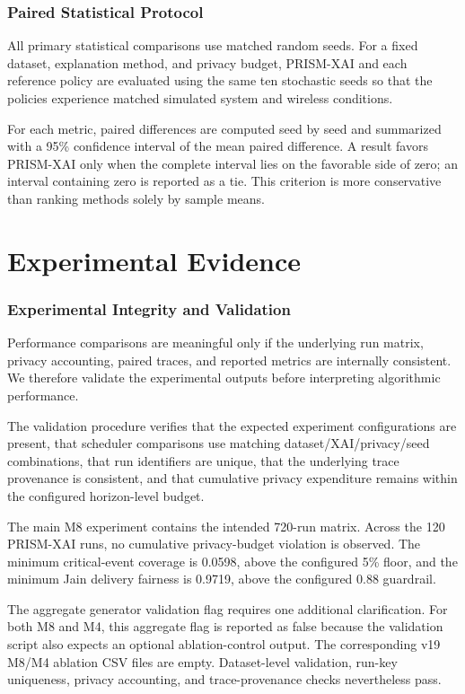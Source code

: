 \documentclass[11pt]{article}
\begin{document}
\section{Paired Statistical Protocol}

All primary statistical comparisons use matched random seeds. For a fixed dataset, explanation method, and privacy budget, PRISM-XAI and each reference policy are evaluated using the same ten stochastic seeds so that the policies experience matched simulated system and wireless conditions.

For each metric, paired differences are computed seed by seed and summarized with a 95\% confidence interval of the mean paired difference. A result favors PRISM-XAI only when the complete interval lies on the favorable side of zero; an interval containing zero is reported as a tie. This criterion is more conservative than ranking methods solely by sample means.

\part{ Experimental Evidence}

\section{Experimental Integrity and Validation}

Performance comparisons are meaningful only if the underlying run matrix, privacy accounting, paired traces, and reported metrics are internally consistent. We therefore validate the experimental outputs before interpreting algorithmic performance.

The validation procedure verifies that the expected experiment configurations are present, that scheduler comparisons use matching dataset/XAI/privacy/seed combinations, that run identifiers are unique, that the underlying trace provenance is consistent, and that cumulative privacy expenditure remains within the configured horizon-level budget.

The main M8 experiment contains the intended 720-run matrix. Across the 120 PRISM-XAI runs, no cumulative privacy-budget violation is observed. The minimum critical-event coverage is 0.0598, above the configured 5\% floor, and the minimum Jain delivery fairness is 0.9719, above the configured 0.88 guardrail.

The aggregate generator validation flag requires one additional clarification. For both M8 and M4, this aggregate flag is reported as false because the validation script also expects an optional ablation-control output. The corresponding v19 M8/M4 ablation CSV files are empty. Dataset-level validation, run-key uniqueness, privacy accounting, and trace-provenance checks nevertheless pass.
\end{document}
